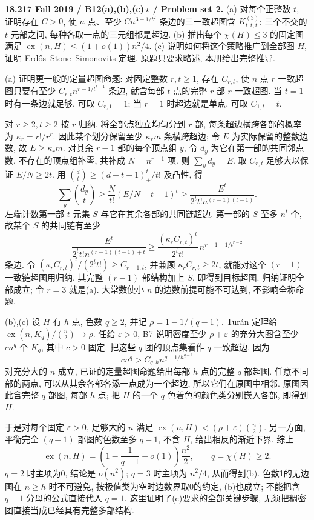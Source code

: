\begin{exercise}\label{mit:18217-b12}
\textbf{18.217 Fall 2019 / B12(a),(b),(c)\,$\star$ / Problem set 2.}
(a) 对每个正整数 $t$, 证明存在 $C>0$, 使 $n$ 点、至少 $Cn^{3-1/t^2}$ 条边的三一致超图含 $K^{(3)}_{t,t,t}$: 三个不交的 $t$ 元部之间, 每种各取一点的三元组都是超边.
(b) 推出每个 $\chi(H)\le3$ 的固定图满足 $\operatorname{ex}(n,H)\le(1+o(1))n^2/4$.
(c) 说明如何将这个策略推广到全部图 $H$, 证明 Erdős--Stone--Simonovits 定理. 原题只要求略述, 本册给出完整推导.
\end{exercise}
\begin{solution}
(a) 证明更一般的定量超图命题: 对固定整数 $r,t\ge1$, 存在 $C_{r,t}$, 使 $n$ 点 $r$ 一致超图只要有至少
$C_{r,t}n^{r-1/t^{r-1}}$ 条边, 就含每部 $t$ 点的完整 $r$ 部 $r$ 一致超图. 当 $t=1$ 时有一条边就足够, 可取 $C_{r,1}=1$; 当 $r=1$ 时超边就是单点, 可取 $C_{1,t}=t$.

对 $r\ge2,t\ge2$ 按 $r$ 归纳. 将全部点独立均匀分到 $r$ 部, 每条超边横跨各部的概率为 $\kappa_r=r!/r^r$. 因此某个划分保留至少 $\kappa_r m$ 条横跨超边; 令 $E$ 为实际保留的整数边数, 故 $E\ge\kappa_r m$. 对其余 $r-1$ 部的每个顶点组 $y$, 令 $d_y$ 为它在第一部的共同邻点数, 不存在的顶点组补零, 共补成 $N=n^{r-1}$ 项. 则 $\sum_y d_y=E$. 取 $C_{r,t}$ 足够大以保证 $E/N\ge2t$. 用
$\binom dt\ge(d-t+1)_+^t/t!$ 及凸性, 得
\[
\sum_y\binom{d_y}{t}
\ge\frac{N}{t!}(E/N-t+1)^t
\ge\frac{E^t}{2^t t!n^{(r-1)(t-1)}}.
\]
左端计数第一部 $t$ 元集 $S$ 与它在其余各部的共同链超边. 第一部的 $S$ 至多 $n^t$ 个, 故某个 $S$ 的共同链有至少
\[
\frac{E^t}{2^t t!n^{(r-1)(t-1)+t}}
\ge\frac{(\kappa_r C_{r,t})^t}{2^t t!}\,
 n^{r-1-1/t^{r-2}}
\]
条边. 令 $(\kappa_r C_{r,t})^t/(2^t t!)\ge C_{r-1,t}$, 并兼顾 $\kappa_r C_{r,t}\ge2t$, 就能对这个 $(r-1)$ 一致链超图用归纳. 其完整 $(r-1)$ 部结构加上 $S$, 即得到目标超图. 归纳证明全部成立; 令 $r=3$ 就是(a). 大常数使小 $n$ 的边数前提可能不可达到, 不影响全称命题.

(b),(c) 设 $H$ 有 $h$ 点, 色数 $q\ge2$, 并记 $\rho=1-1/(q-1)$. Turán 定理给
$\operatorname{ex}(n,K_q)/\binom n2\to\rho$.
任给 $\varepsilon>0$, B7 说明密度至少 $\rho+\varepsilon$ 的充分大图含至少 $cn^q$ 个 $K_q$, 其中 $c>0$ 固定. 把这些 $q$ 团的顶点集看作 $q$ 一致超边. 因为
\[
cn^q>C_{q,h}n^{q-1/h^{q-1}}
\]
对充分大的 $n$ 成立, 已证的定量超图命题给出每部 $h$ 点的完整 $q$ 部超图. 任意不同部的两点, 可以从其余各部各添一点成为一个超边, 所以它们在原图中相邻. 原图因此含完整 $q$ 部图, 每部 $h$ 点; 把 $H$ 的一个 $q$ 色着色的颜色类分别嵌入各部, 即得到 $H$.

于是对每个固定 $\varepsilon>0$, 足够大的 $n$ 满足
$\operatorname{ex}(n,H)<(\rho+\varepsilon)\binom n2$.
另一方面, 平衡完全 $(q-1)$ 部图的色数至多 $q-1$, 不含 $H$, 给出相反的渐近下界. 综上
\[
\operatorname{ex}(n,H)=
\left(1-\frac1{q-1}+o(1)\right)\frac{n^2}{2},
\qquad q=\chi(H)\ge2.
\]
$q=2$ 时主项为0, 结论是 $o(n^2)$; $q=3$ 时主项为 $n^2/4$, 从而得到(b). 色数1的无边图在 $n\ge h$ 时不可避免, 按极值类为空时边数界取0的约定, (b)也成立; 不能把含 $q-1$ 分母的公式直接代入 $q=1$. 这里证明了(c)要求的全部关键步骤, 无须把稠密团直接当成已经具有完整多部结构.
\end{solution}


